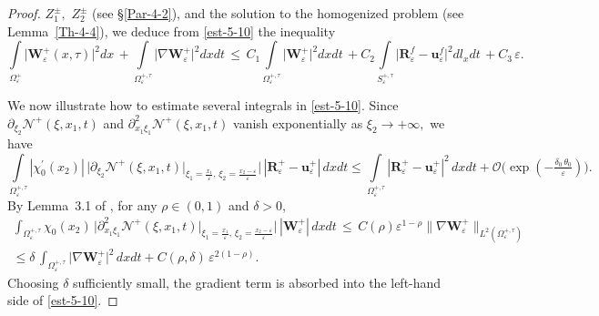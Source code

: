 \documentclass[reqno]{amsart}            %
\numberwithin{equation}{section}
\begin{document}
\begin{proof}
		$Z^\pm_1,$ $Z^\pm_2$ (see \S \ref{Par-4-2}), and the solution to the homogenized problem (see Lemma~\ref{Th-4-4}),  we deduce from \eqref{est-5-10} the inequality    
		\begin{equation}\label{main-omega+}
			\int\limits_{\Omega_\varepsilon^+} \big|\mathbf{W}^+_\varepsilon(x,\tau)\big|^2  dx\,  + \int\limits_{\Omega_\varepsilon^{+, \tau}} \big|\nabla \mathbf{W}^+_\varepsilon\big|^2  dxdt \, \le \, C_1\int\limits_{\Omega_\varepsilon^{+, \tau}} \big|\mathbf{W}^+_\varepsilon\big|^2  dxdt \,
			+ C_2 \int\limits_{S_\varepsilon^{+, \tau}} \big|\mathbf{R}^f_\varepsilon - \mathbf{u}^f_\varepsilon\big|^2  dl_xdt \, + C_3 \, \varepsilon. 
		\end{equation}
		
		We now illustrate how to estimate several integrals in \eqref{est-5-10}. Since  $\partial_{\xi_2}\boldsymbol{\mathcal{N}}^+(\xi,x_1,t)$ and $\partial^2_{x_1\xi_1}\boldsymbol{\mathcal{N}}^+(\xi,x_1,t)$  vanish exponentially as $\xi_2 \to +\infty,$ we have  
		$$
		\int\limits_{\Omega_\varepsilon^{+, \tau}} |\chi^\prime_0(x_2)| \, \big| \partial_{\xi_2}\boldsymbol{\mathcal{N}}^+(\xi,x_1,t)\big|_{\xi_1=\frac{x_1}{\varepsilon}, \, \xi_2=\frac{x_2 - \varepsilon}{\varepsilon}}\big|
		\, |\mathbf{R}^+_\varepsilon - \mathbf{u}^+_\varepsilon|\, dxdt \le 
		\int\limits_{\Omega_\varepsilon^{+, \tau}} |\mathbf{R}^+_\varepsilon - \mathbf{u}^+_\varepsilon|^2\, dxdt + \mathcal{O}\big(\exp(- \tfrac{\delta_0\, \theta_0}{\varepsilon})\big). 
		$$
		By Lemma~3.1 of \cite{Mel-Naz-1997}, for any $\rho\in(0,1)$ and $\delta>0$, 
		\begin{multline*}
			\int_{\Omega_\varepsilon^{+, \tau}} \chi_0(x_2) \, \big|\partial^2_{x_1\xi_1}\boldsymbol{\mathcal{N}}^+(\xi,x_1,t)\big|_{\xi_1=\frac{x_1}{\varepsilon}, \, \xi_2=\frac{x_2 - \varepsilon}{\varepsilon}}\big| \, |\mathbf{W}^+_\varepsilon|\, dxdt \, \le \, C(\rho) \varepsilon^{1-\rho}\|\nabla \mathbf{W}^+_\varepsilon\|_{L^2(\Omega_\varepsilon^{+, \tau})}
			\\
			\le \delta \, \int_{\Omega_\varepsilon^{+, \tau}} \big|\nabla \mathbf{W}^+_\varepsilon\big|^2 \, dxdt + C(\rho,\delta)\, \varepsilon^{2(1-\rho)}.
		\end{multline*}
		Choosing $\delta$ sufficiently small, the gradient term is absorbed into the left-hand side of \eqref{est-5-10}.
		

\end{proof}
\end{document}
